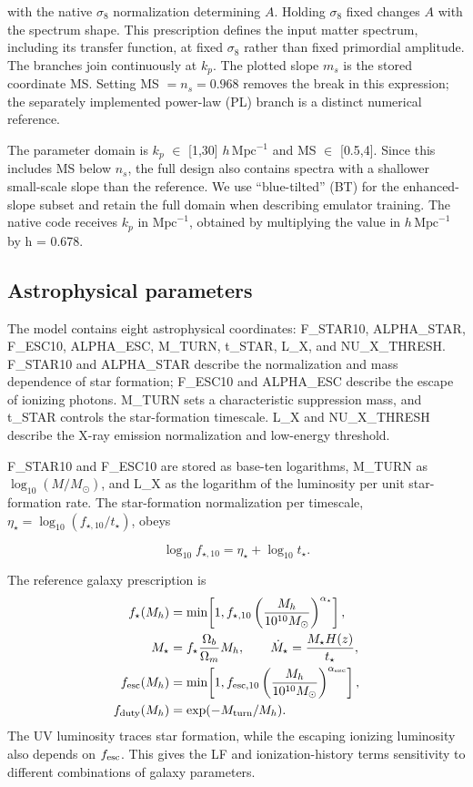 with the native $\sigma_8$ normalization determining $A$. Holding $\sigma_8$ fixed changes $A$ with the spectrum shape. This prescription defines the input matter spectrum, including its transfer function, at fixed $\sigma_8$ rather than fixed primordial amplitude. The branches join continuously at \ensuremath{k_p}. The plotted slope $m_s$ is the stored coordinate MS. Setting MS $=n_s=0.968$ removes the break in this expression; the separately implemented power-law (PL) branch is a distinct numerical reference.

The parameter domain is \ensuremath{k_p} \(\in\) {[}1,30{]} $h\,\mathrm{Mpc}^{-1}$ and MS \(\in\) {[}0.5,4{]}. Since this includes MS below $n_s$, the full design also contains spectra with a shallower small-scale slope than the reference. We use ``blue-tilted'' (BT) for the enhanced-slope subset and retain the full domain when describing emulator training. The native code receives \ensuremath{k_p} in $\mathrm{Mpc}^{-1}$, obtained by multiplying the value in $h\,\mathrm{Mpc}^{-1}$ by h = 0.678.

\subsection{Astrophysical parameters}\label{astrophysical-parameters}

The model contains eight astrophysical coordinates: F\_STAR10, ALPHA\_STAR, F\_ESC10, ALPHA\_ESC, M\_TURN, t\_STAR, L\_X, and NU\_X\_THRESH. F\_STAR10 and ALPHA\_STAR describe the normalization and mass dependence of star formation; F\_ESC10 and ALPHA\_ESC describe the escape of ionizing photons. M\_TURN sets a characteristic suppression mass, and t\_STAR controls the star-formation timescale. L\_X and NU\_X\_THRESH describe the X-ray emission normalization and low-energy threshold.

F\_STAR10 and F\_ESC10 are stored as base-ten logarithms, M\_TURN as $\log_{10}(M/M_\odot)$, and L\_X as the logarithm of the luminosity per unit star-formation rate. The star-formation normalization per timescale, $\eta_\star=\log_{10}(f_{\star,10}/t_\star)$, obeys

\begin{equation}\log_{10}f_{\star,10}=\eta_\star+\log_{10}t_\star.\end{equation}

The reference galaxy prescription \cite{Park2019} is
\begin{align}
f_\star(M_h)&=\min\!\left[1,f_{\star,10}\left(\frac{M_h}{10^{10}M_\odot}\right)^{\alpha_\star}\right],\\
M_\star&=f_\star\frac{\Omega_b}{\Omega_m}M_h,\qquad
\dot M_\star=\frac{M_\star H(z)}{t_\star},\\
f_{\rm esc}(M_h)&=\min\!\left[1,f_{{\rm esc},10}\left(\frac{M_h}{10^{10}M_\odot}\right)^{\alpha_{\rm esc}}\right],\\
f_{\rm duty}(M_h)&=\exp(-M_{\rm turn}/M_h).
\end{align}
The UV luminosity traces star formation, while the escaping ionizing luminosity also depends on $f_{\rm esc}$. This gives the LF and ionization-history terms sensitivity to different combinations of galaxy parameters.

